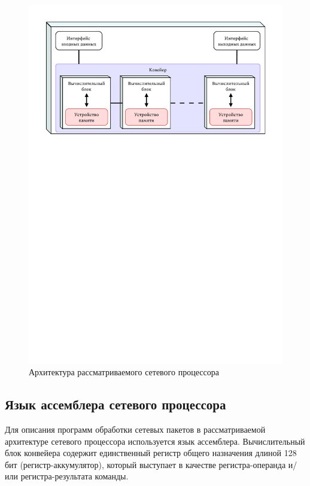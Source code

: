 \documentclass[oneside,final,12pt]{extarticle}
\begin{document}
            \begin{figure}[h]
                \centering
                \includegraphics[trim=0 1000 0 0,clip,width=\textwidth]{npu.pdf}
                \caption{Архитектура рассматриваемого сетевого процессора}
            \end{figure}
            
        \subsection{Язык ассемблера сетевого процессора}
            \label{sect:asm}
            Для описания программ обработки сетевых пакетов в рассматриваемой архитектуре сетевого процессора используется язык ассемблера.
            Вычислительный блок конвейера содержит единственный регистр общего назначения длиной 128 бит (регистр-аккумулятор), который выступает в качестве регистра-операнда и/или регистра-результата команды.
\end{document}
